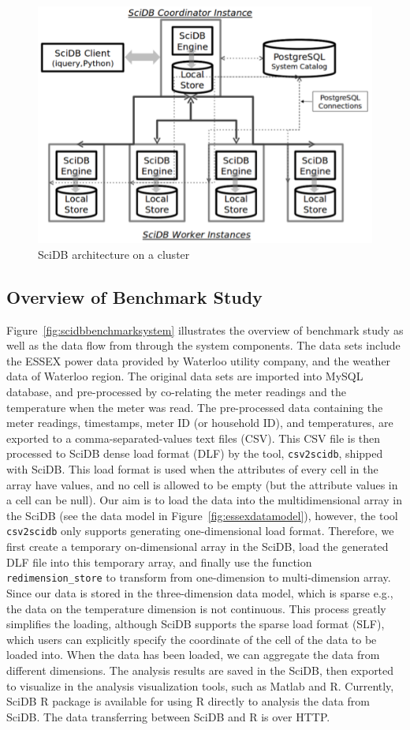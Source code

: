 \documentclass[a4paper,12pt]{llncs}
\newcommand{\eg}{e.g.}
\begin{document}
\begin{figure}[htp]
\centering
\includegraphics[width=250 px]{images/scidbcluster}
\caption{SciDB architecture on a cluster}
\label{fig:scidbcluster}
\vspace{-10pt}
\end{figure}





\subsection{Overview of Benchmark Study}
Figure~\ref{fig:scidbbenchmarksystem} illustrates the overview of benchmark study as well as the data flow from through the system components. The data sets include the ESSEX power data provided by Waterloo utility company, and the weather data of Waterloo region. The original data sets are imported into MySQL database, and pre-processed by co-relating the meter readings and the temperature when the meter was read. The pre-processed data containing the meter readings, timestamps, meter ID (or household ID), and temperatures, are exported to a comma-separated-values text files (CSV). This CSV file is then processed to SciDB dense load format (DLF) by the tool, \texttt{csv2scidb}, shipped with SciDB.  This load format is used when the attributes of every cell in the array have values, and no cell is allowed to be empty (but the attribute values in a cell can be null).  Our aim is to load the data into the multidimensional array in the SciDB (see the data model in Figure~\ref{fig:essexdatamodel}), however, the tool \texttt{csv2scidb}  only supports generating one-dimensional load format. Therefore, we first create a temporary on-dimensional array in the SciDB,  load the generated DLF file into this temporary array, and finally use the function \texttt{redimension\_store} to transform from one-dimension to multi-dimension array.  Since our data is stored in the three-dimension data model, which is sparse \eg, the data on the temperature dimension is not continuous. This process greatly simplifies the loading, although SciDB supports the sparse load format (SLF), which users can explicitly specify the coordinate of the cell of the data to be loaded into. When the data has been loaded, we can   aggregate the data from different dimensions. The analysis results are saved in the SciDB, then exported to visualize in the analysis visualization tools, such as Matlab and R. Currently, SciDB R package \cite{scidbr} is available for using R directly to analysis the data from SciDB.  The data transferring  between SciDB and R is over HTTP. 
\end{document}
